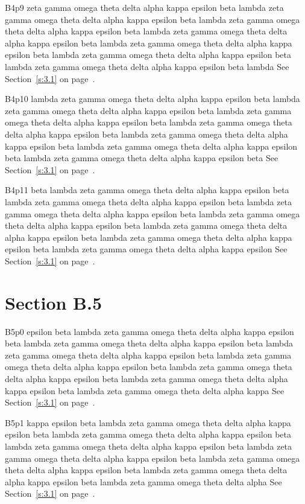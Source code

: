B4p9 zeta gamma omega theta delta alpha kappa epsilon beta lambda zeta gamma omega theta delta alpha kappa epsilon beta lambda zeta gamma omega theta delta alpha kappa epsilon beta lambda zeta gamma omega theta delta alpha kappa epsilon beta lambda zeta gamma omega theta delta alpha kappa epsilon beta lambda zeta gamma omega theta delta alpha kappa epsilon beta lambda zeta gamma omega theta delta alpha kappa epsilon beta lambda See Section~\ref{s:3.1} on page~\pageref{s:3.1}.

B4p10 lambda zeta gamma omega theta delta alpha kappa epsilon beta lambda zeta gamma omega theta delta alpha kappa epsilon beta lambda zeta gamma omega theta delta alpha kappa epsilon beta lambda zeta gamma omega theta delta alpha kappa epsilon beta lambda zeta gamma omega theta delta alpha kappa epsilon beta lambda zeta gamma omega theta delta alpha kappa epsilon beta lambda zeta gamma omega theta delta alpha kappa epsilon beta See Section~\ref{s:3.1} on page~\pageref{s:3.1}.

B4p11 beta lambda zeta gamma omega theta delta alpha kappa epsilon beta lambda zeta gamma omega theta delta alpha kappa epsilon beta lambda zeta gamma omega theta delta alpha kappa epsilon beta lambda zeta gamma omega theta delta alpha kappa epsilon beta lambda zeta gamma omega theta delta alpha kappa epsilon beta lambda zeta gamma omega theta delta alpha kappa epsilon beta lambda zeta gamma omega theta delta alpha kappa epsilon See Section~\ref{s:3.1} on page~\pageref{s:3.1}.

\section{Section B.5}\label{s:B.5}
B5p0 epsilon beta lambda zeta gamma omega theta delta alpha kappa epsilon beta lambda zeta gamma omega theta delta alpha kappa epsilon beta lambda zeta gamma omega theta delta alpha kappa epsilon beta lambda zeta gamma omega theta delta alpha kappa epsilon beta lambda zeta gamma omega theta delta alpha kappa epsilon beta lambda zeta gamma omega theta delta alpha kappa epsilon beta lambda zeta gamma omega theta delta alpha kappa See Section~\ref{s:3.1} on page~\pageref{s:3.1}.

B5p1 kappa epsilon beta lambda zeta gamma omega theta delta alpha kappa epsilon beta lambda zeta gamma omega theta delta alpha kappa epsilon beta lambda zeta gamma omega theta delta alpha kappa epsilon beta lambda zeta gamma omega theta delta alpha kappa epsilon beta lambda zeta gamma omega theta delta alpha kappa epsilon beta lambda zeta gamma omega theta delta alpha kappa epsilon beta lambda zeta gamma omega theta delta alpha See Section~\ref{s:3.1} on page~\pageref{s:3.1}.

